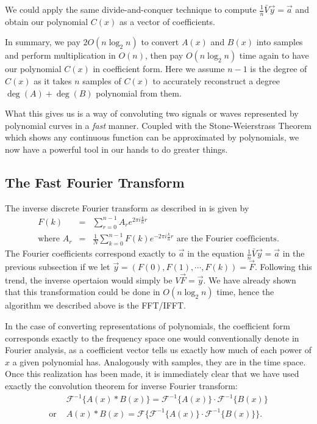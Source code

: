 \documentclass[12pt]{article}
\begin{document}
We could apply the same divide-and-conquer technique to compute $\frac{1}{n}\bar{V}\vec{y} = \vec{a}$ and obtain our polynomial $C(x)$ as a vector of coefficients.

In summary, we pay $2O(n\log_2{n})$ to convert $A(x)$ and $B(x)$ into samples and perform multiplication in $O(n)$, then pay $O(n\log_2{n})$ time again to have our polynomial $C(x)$ in coefficient form. Here we assume $n-1$ is the degree of $C(x)$ as it takes $n$ samples of $C(x)$ to accurately reconstruct a degree $\deg(A)+\deg(B)$ polynomial from them. 

What this gives us is a way of convoluting two signals or waves represented by polynomial curves in a \emph{fast} manner. Coupled with the Stone-Weierstrass Theorem which shows any continuous function can be approximated by polynomials, we now have a powerful tool in our hands to do greater things.

\subsection{The Fast Fourier Transform}


The inverse discrete Fourier transform as described in \cite{text} is given by
\begin{eqnarray*}
F(k) &=& \displaystyle \sum_{r=0}^{n-1} A_r e^{2\pi i\frac{k}{n}r}\\
\text{where } A_r &=& \frac{1}{N} \displaystyle \sum_{k=0}^{n-1} F(k) e^{-2\pi i\frac{k}{n}r} \text{ are the Fourier coefficients}.
\end{eqnarray*}
The Fourier coefficients correspond exactly to $\vec{a}$ in the equation $\frac{1}{n}\bar{V}\vec{y}=\vec{a}$ in the previous subsection if we let $\vec{y} = (F(0),F(1),\cdots,F(k)) = \vec{F}$. Following this trend, the inverse opertaion would simply be $V\vec{F} = \vec{y}$. We have already shown that this transformation could be done in $O(n\log_2n)$ time, hence the algorithm we described above is the FFT/IFFT.

In the case of converting representations of polynomials, the coefficient form corresponds exactly to the frequency space one would conventionally denote in Fourier analysis, as a coefficient vector tells us exactly how much of each power of $x$ a given polynomial has. Analogously with samples, they are in the time space. Once this realization has been made, it is immediately clear that we have used exactly the convolution theorem for inverse Fourier transform: 
\begin{eqnarray*}
&\mathscr{F}^{-1}\{A(x)*B(x)\} =\mathscr{F}^{-1}\{A(x)\}\cdot\mathscr{F}^{-1}\{B(x)\}\\
\text{or } &A(x)*B(x) =\mathscr{F}\{\mathscr{F}^{-1}\{A(x)\}\cdot\mathscr{F}^{-1}\{B(x)\}\}.
\end{eqnarray*}
\end{document}
